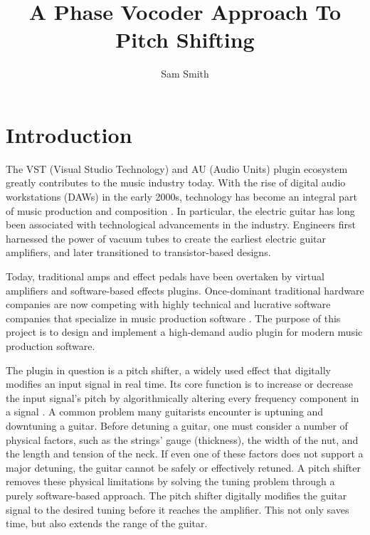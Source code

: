 \documentclass[12pt]{article}
\title{\textbf{A Phase Vocoder Approach To Pitch Shifting}}
\author{Sam Smith}
\begin{document}
\maketitle

\section{Introduction}
The VST (Visual Studio Technology) and AU (Audio Units) plugin ecosystem greatly contributes to the music industry today.
With the rise of digital audio workstations (DAWs) in the early 2000s, technology has become an integral part of music production and composition \cite{rana2024influence}.
In particular, the electric guitar has long been associated with technological advancements in the industry.
Engineers first harnessed the power of vacuum tubes to create the earliest electric guitar amplifiers, and later transitioned to transistor-based designs.


Today, traditional amps and effect pedals have been overtaken by virtual amplifiers and software-based effects plugins. Once-dominant traditional hardware companies
are now competing with highly technical and lucrative software companies that specialize in music production software \cite{rana2024influence}. The purpose of this project
is to design and implement a high-demand audio plugin for modern music production software. 

The plugin in question is a pitch shifter, a widely used effect that digitally modifies an input signal in real time. 
Its core function is to increase or decrease the input signal's pitch by algorithmically altering every
frequency component in a signal \cite{rai2019analysis}. A common problem many guitarists encounter is uptuning and downtuning a guitar.
Before detuning a guitar, one must consider a number of physical factors, such as the strings' gauge (thickness), 
the width of the nut, and the length and tension of the neck. If even one of these factors does not support a major detuning, 
the guitar cannot be safely or effectively retuned. A pitch shifter removes these physical limitations by solving the tuning problem 
through a purely software-based approach. The pitch shifter digitally modifies the guitar signal 
to the desired tuning before it reaches the amplifier. This not only saves time, but also extends the range of the guitar.
\end{document}
